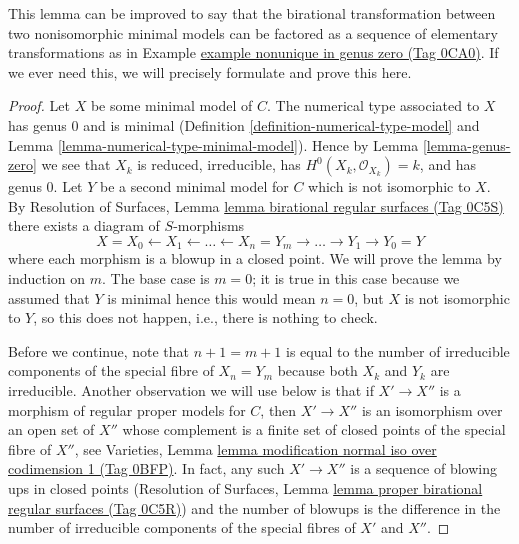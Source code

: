 \documentclass{amsart}
\theoremstyle{plain}
\theoremstyle{definition}
\theoremstyle{remark}
\numberwithin{equation}{subsection}
\begin{document}
\noindent
This lemma can be improved to say that the birational transformation
between two nonisomorphic minimal models can be factored as a sequence of
elementary transformations as in Example \href{https://stacks.math.columbia.edu/tag/0CA0}{example nonunique in genus zero (Tag 0CA0)}.
If we ever need this, we will precisely formulate and prove this here.

\begin{proof}
Let $X$ be some minimal model of $C$. The numerical type associated to $X$
has genus $0$ and is minimal (Definition \ref{definition-numerical-type-model}
and Lemma \ref{lemma-numerical-type-minimal-model}).
Hence by Lemma \ref{lemma-genus-zero} we see that
$X_k$ is reduced, irreducible, has $H^0(X_k, \mathcal{O}_{X_k}) = k$,
and has genus $0$. Let $Y$ be a second minimal model for $C$
which is not isomorphic to $X$. By
Resolution of Surfaces, Lemma \href{https://stacks.math.columbia.edu/tag/0C5S}{lemma birational regular surfaces (Tag 0C5S)}
there exists a diagram of $S$-morphisms
$$
X = X_0 \leftarrow X_1 \leftarrow \ldots \leftarrow X_n = Y_m
\to \ldots \to Y_1 \to Y_0 = Y
$$
where each morphism is a blowup in a closed point. We will prove the
lemma by induction on $m$. The base case is $m = 0$; it is
true in this case because we assumed that $Y$ is minimal
hence this would mean $n = 0$, but $X$ is not isomorphic
to $Y$, so this does not happen, i.e., there is nothing to check.

\medskip\noindent
Before we continue, note that $n + 1 = m + 1$ is equal to the number of
irreducible components of the special fibre of $X_n = Y_m$ because
both $X_k$ and $Y_k$ are irreducible. Another observation we
will use below is that if $X' \to X''$ is a morphism
of regular proper models for $C$, then $X' \to X''$ is an isomorphism
over an open set of $X''$ whose complement is a finite set
of closed points of the special fibre of $X''$, see
Varieties, Lemma
\href{https://stacks.math.columbia.edu/tag/0BFP}{lemma modification normal iso over codimension 1 (Tag 0BFP)}.
In fact, any such $X' \to X''$ is a sequence
of blowing ups in closed points (Resolution of Surfaces, Lemma
\href{https://stacks.math.columbia.edu/tag/0C5R}{lemma proper birational regular surfaces (Tag 0C5R)}) and the
number of blowups is the difference in the number of irreducible
components of the special fibres of $X'$ and $X''$.


\end{proof}
\end{document}
